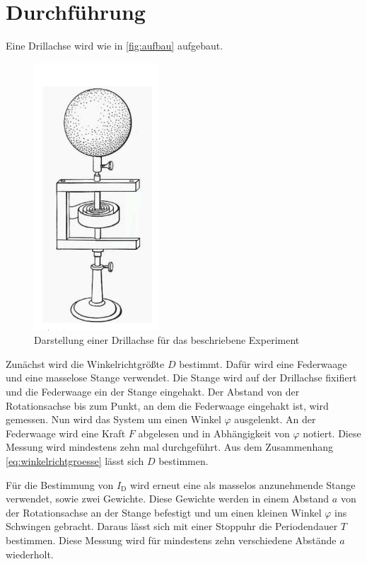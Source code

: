 \section{Durchführung}
\label{sec:Durchführung}

Eine Drillachse wird wie in \autoref{fig:aufbau} aufgebaut.

\begin{figure}
    \centering
    \includegraphics[height=10cm]{images/aufbau.png}
    \caption{Darstellung einer Drillachse für das beschriebene Experiment \cite{V101}}
    \label{fig:aufbau}
\end{figure}

Zunächst wird die Winkelrichtgrößte $D$ bestimmt. 
Dafür wird eine Federwaage und eine masselose Stange verwendet.
Die Stange wird auf der Drillachse fixifiert und die Federwaage ein der Stange eingehakt. 
Der Abstand von der Rotationsachse bis zum Punkt, an dem die Federwaage eingehakt ist, wird gemessen.
Nun wird das System um einen Winkel $\varphi$ ausgelenkt. 
An der Federwaage wird eine Kraft $F$ abgelesen und in Abhängigkeit von $\varphi$ notiert. 
Diese Messung wird mindestens zehn mal durchgeführt. 
Aus dem Zusammenhang \autoref{eq:winkelrichtgroesse} lässt sich $D$ bestimmen.

Für die Bestimmung von $I_\text{D}$ wird erneut eine als masselos anzunehmende Stange verwendet, sowie zwei Gewichte.
Diese Gewichte werden in einem Abstand $a$ von der Rotationsachse an der Stange befestigt und um einen kleinen Winkel $\varphi$ ins Schwingen gebracht. 
Daraus lässt sich mit einer Stoppuhr die Periodendauer $T$ bestimmen. 
Diese Messung wird für mindestens zehn verschiedene Abstände $a$ wiederholt. 


